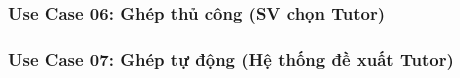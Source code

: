 \newpage
\subsubsection*{Use Case 06: Ghép thủ công (SV chọn Tutor)}
\begin{samepage}

\end{samepage}


\newpage
\subsubsection*{Use Case 07: Ghép tự động (Hệ thống đề xuất Tutor)}
\begin{samepage}

\end{samepage}

